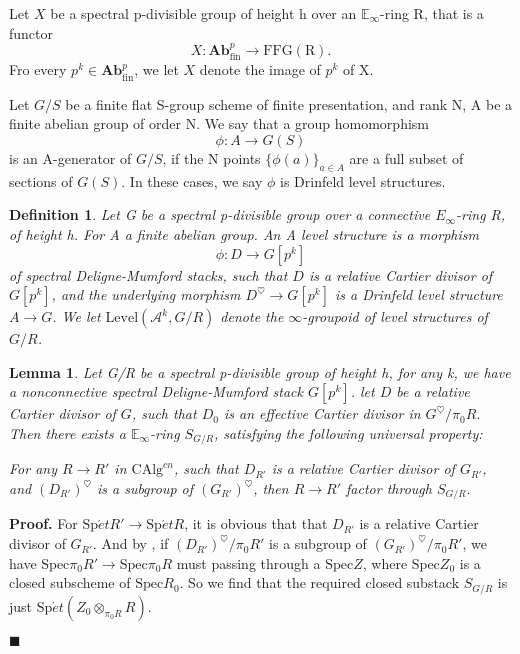 \documentclass[12pt]{article}
\newtheorem{lemma}[theorem]{Lemma}
\theoremstyle{thry}
\newtheorem{definition}[theorem]{Definition}
\renewenvironment{proof}
{\par \noindent \textbf{Proof.}}
{ \par \hfill $\blacksquare$ \quad \par }
\def  \Ab       {\mathbf{Ab}}
\def  \CAlg     {\mathrm{CAlg}}
\def  \Level    {\mathrm{Level}}
\def  \Spec     {\mathrm{Spec}}
\def  \Spet     {\mathrm{Sp}\acute{e}t}
\def  \ca       {\mathcal{A}}
\def  \be       {\mathbb{E}}
\begin{document}
Let $X$ be a spectral p-divisible group of height h over an $\be_{\infty}$-ring R, that is  a functor 
$$
X:  \Ab^p_{\mathrm{fin}} \to \mathrm{FFG(R)}.
$$
Fro every $p^k \in \Ab^p_{\mathrm{fin}}$, we let $X$ denote the image of $p^k$ of X.



 Let $G/S$ be a finite flat  S-group scheme of finite presentation, and rank N,  A be a finite abelian group of order N. We say that a group homomorphism
 $$
 \phi: A \to G(S)
 $$
 is an A-generator of $G/S$, if the  N points $\{\phi(a)\}_{a \in A}$ are a full subset of sections of $G(S)$. In these cases, we say $\phi$ is Drinfeld level structures.
\begin{definition}
	 Let G be a spectral p-divisible group over a connective $E_{\infty}$-ring R, of height h. For A  a finite abelian group. An A level structure is a morphism
	 $$
	 \phi: D \to G[p^k]
	 $$
	 of spectral Deligne-Mumford stacks,  such that $D$ is a relative Cartier divisor of $G[p^k]$, and the underlying morphism $D^{\heartsuit} \to G[p^k]$ is a Drinfeld level structure $A \to G$. We let $\Level(\ca^k, G/R)$ denote the $\infty$-groupoid of level structures of $G/R$.
\end{definition}

\begin{lemma}\label{divisor p-divisible}
		Let G/R be a spectral p-divisible group of height h, for any k, we have a nonconnective spectral Deligne-Mumford stack $G[p^k]$.  let $D$ be a relative Cartier divisor of $G$,  such that $D_0$ is an effective Cartier divisor in $G^{\heartsuit}/\pi_0 R$. Then there exists a $\be_{\infty}$-ring  $S_{G/R}$, satisfying the following universal property: 
		
		For any $R \to R'$ in $\CAlg^{cn}$, such that $D_{R'}$ is a relative Cartier divisor of $G_{R'}$,  and $(D_{R'})^{\heartsuit}$ is a subgroup of $(G_{R'})^{\heartsuit}$, then $R \to R' $ factor through $S_{G/R}$.
\end{lemma}
\begin{proof}
	  For $\Spet R'  \to \Spet R$,  it  is obvious that that $D_{R'}$ is a relative Cartier divisor of $G_{R'}$. And by \cite[Corollarly 1.3.7]{katz1985arithmetic},   if $(D_{R'})^{\heartsuit}/ \pi_0 R'$ is a subgroup of $(G_{R'})^{\heartsuit}/ \pi_0 R'$,  we have $ \Spec \pi_0 R'  \to \Spec \pi_0R$ must passing through a $\Spec Z$, where $\Spec Z_0$ is a closed subscheme of $\Spec R_0$. So we find that the required closed substack  $S_{G/R}$ is just $ \Spet(Z_0\otimes_{\pi_0 R} R)$.
	
\end{proof}	
\end{document}
